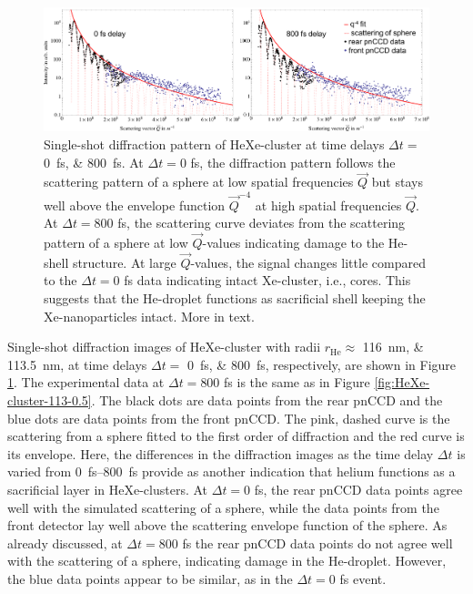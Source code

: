 \begin{figure}
	\centering
		\includegraphics[width=1.00\textwidth]{images/results/HeXe-comparison-0-800-fs.png}
	\caption[Single-shot diffraction patterns of HeXe-cluster at different time delays]{Single-shot diffraction pattern of HeXe-cluster at time delays $\Delta t =$ 
	\SIlist{0;800}{\femto\second}. At $\Delta t=0$ fs, the diffraction pattern follows the scattering pattern of a sphere at low spatial frequencies $\vec{Q}$ but stays well above the envelope function $\vec{Q}^{-4}$ at high spatial frequencies $\vec{Q}$. At $\Delta t=800$ fs, the scattering curve deviates from the scattering pattern of a sphere at low $\vec{Q}$-values indicating damage to the He-shell structure. At large $\vec{Q}$-values, the signal changes little compared to the $\Delta t=0$ fs data indicating intact Xe-cluster, i.e., cores. This suggests that the He-droplet functions as sacrificial shell keeping the Xe-nanoparticles intact. More in text.}
	\label{fig:HeXe-comparison-0-800-fs}
\end{figure}
%
Single-shot diffraction images of HeXe-cluster with radii $r_{\text{He}}\approx$ \SIlist{116;113.5}{\nano\meter}, at time delays $\Delta t =$ \SIlist{0;800}{\femto\second}, respectively, are shown in Figure \ref{fig:HeXe-comparison-0-800-fs}. The experimental data at $\Delta t = 800$ fs is the same as in Figure \ref{fig:HeXe-cluster-113-0.5}. The black dots are data points from the rear pnCCD and the blue dots are data points from the front pnCCD. The pink, dashed curve is the scattering from a sphere fitted to the first order of diffraction and the red curve is its envelope. Here, the differences in the diffraction images as the time delay $\Delta t$ is varied from \SIrange{0}{800}{\femto\second} provide as another indication that helium functions as a sacrificial layer in HeXe-clusters. At $\Delta t=0$ fs, the rear pnCCD data points agree well with the simulated scattering of a sphere, while the data points from the front detector lay well above the scattering envelope function of the sphere. As already discussed, at $\Delta t = 800$ fs the rear pnCCD data points do not agree well with the scattering of a sphere, indicating damage in the He-droplet. However, the blue data points appear to be similar, as in the $\Delta t=0$ fs event.\\[1\baselineskip]
